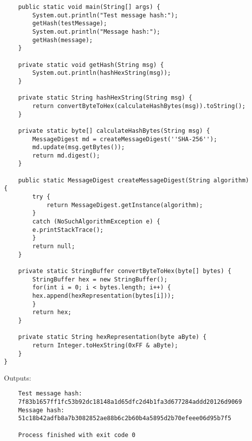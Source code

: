 \documentclass[a4paper]{article}
\begin{document}
\begin{enumerate}
\begin{lstlisting}
	public static void main(String[] args) {
	    System.out.println("Test message hash:");
	    getHash(testMessage);
	    System.out.println("Message hash:");
	    getHash(message);
	}

	private static void getHash(String msg) {
	    System.out.println(hashHexString(msg));
	}

	private static String hashHexString(String msg) {
	    return convertByteToHex(calculateHashBytes(msg)).toString();
	}

	private static byte[] calculateHashBytes(String msg) {
	    MessageDigest md = createMessageDigest(''SHA-256'');
	    md.update(msg.getBytes());
	    return md.digest();
	}

	public static MessageDigest createMessageDigest(String algorithm) {
	    try {
	        return MessageDigest.getInstance(algorithm);
	    }
	    catch (NoSuchAlgorithmException e) {
		e.printStackTrace();
	    }
	    return null;
	}

	private static StringBuffer convertByteToHex(byte[] bytes) {
	    StringBuffer hex = new StringBuffer();
	    for(int i = 0; i < bytes.length; i++) {
		hex.append(hexRepresentation(bytes[i]));
	    }
	    return hex;
	}

	private static String hexRepresentation(byte aByte) {
	    return Integer.toHexString(0xFF & aByte);
	}
}
\end{lstlisting}
Outputs:
\begin{verbatim}
	Test message hash:
	7f83b1657ff1fc53b92dc18148a1d65dfc2d4b1fa3d677284addd20126d9069
	Message hash:
	51c18b42adfb8a7b3082852ae88b6c2b60b4a5895d2b70efeee06d95b7f5

	Process finished with exit code 0
\end{verbatim}
	\end{enumerate}
\end{document}
